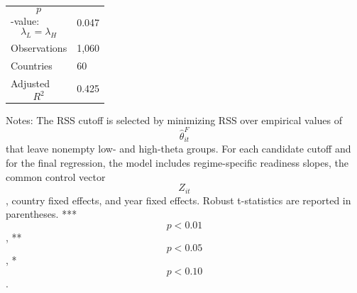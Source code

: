 \begin{table}[H]
\begin{threeparttable}
\begin{tabularx}{\textwidth}{lY}
$$p$$-value: $$\lambda_L=\lambda_H$$ & 0.047 \\
Observations & 1,060 \\
Countries & 60 \\
Adjusted $$R^2$$ & 0.425 \\
\bottomrule
\end{tabularx}
\begin{tablenotes}[flushleft]\footnotesize
\item Notes: The RSS cutoff is selected by minimizing RSS over empirical values of $$\widehat{\theta}^{F}_{it}$$ that leave nonempty low- and high-theta groups. For each candidate cutoff and for the final regression, the model includes regime-specific readiness slopes, the common control vector $$Z_{it}$$, country fixed effects, and year fixed effects. Robust t-statistics are reported in parentheses. *** $$p<0.01$$, ** $$p<0.05$$, * $$p<0.10$$.
\end{tablenotes}
\end{threeparttable}
\end{table}
